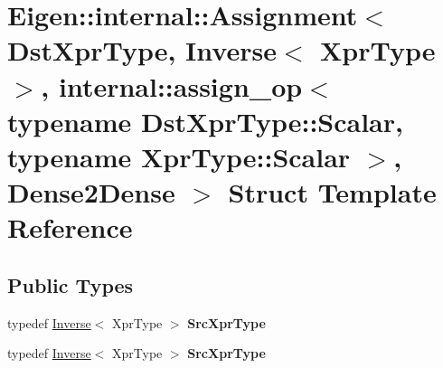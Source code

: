 \hypertarget{struct_eigen_1_1internal_1_1_assignment_3_01_dst_xpr_type_00_01_inverse_3_01_xpr_type_01_4_00_019b24182f99081c1fc09beae63c4c392d}{}\section{Eigen\+:\+:internal\+:\+:Assignment$<$ Dst\+Xpr\+Type, Inverse$<$ Xpr\+Type $>$, internal\+:\+:assign\+\_\+op$<$ typename Dst\+Xpr\+Type\+:\+:Scalar, typename Xpr\+Type\+:\+:Scalar $>$, Dense2\+Dense $>$ Struct Template Reference}
\label{struct_eigen_1_1internal_1_1_assignment_3_01_dst_xpr_type_00_01_inverse_3_01_xpr_type_01_4_00_019b24182f99081c1fc09beae63c4c392d}
\subsection*{Public Types}
\begin{DoxyCompactItemize}
\item 
\mbox{\label{struct_eigen_1_1internal_1_1_assignment_3_01_dst_xpr_type_00_01_inverse_3_01_xpr_type_01_4_00_019b24182f99081c1fc09beae63c4c392d_a5da1a8b1aecc8ceb7b2086590499d960}} 
typedef \hyperlink{class_eigen_1_1_inverse}{Inverse}$<$ Xpr\+Type $>$ {\bfseries Src\+Xpr\+Type}
\item 
\mbox{\label{struct_eigen_1_1internal_1_1_assignment_3_01_dst_xpr_type_00_01_inverse_3_01_xpr_type_01_4_00_019b24182f99081c1fc09beae63c4c392d_a5da1a8b1aecc8ceb7b2086590499d960}} 
typedef \hyperlink{class_eigen_1_1_inverse}{Inverse}$<$ Xpr\+Type $>$ {\bfseries Src\+Xpr\+Type}
\end{DoxyCompactItemize}
